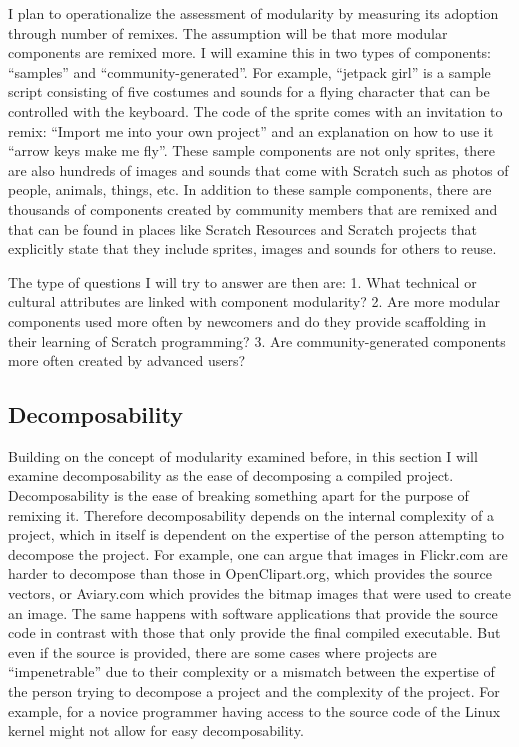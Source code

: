 I plan to operationalize the assessment of modularity by measuring its adoption through number of remixes.
The assumption will be that more modular components are remixed more.
I will examine this in two types of components:  ``samples'' and ``community-generated''.
For example, ``jetpack girl'' is a sample script consisting of five costumes and  sounds for a flying character that can be controlled with the keyboard.
The code of the sprite comes with an invitation to remix: ``Import me into your own project'' and an explanation on how to use it ``arrow keys make me fly''.
These sample components are not only sprites, there are also hundreds of images and sounds that come with Scratch such as photos of people, animals, things, etc.
In addition to these sample components, there are thousands of components created by community members that are remixed and that can be found in places like Scratch Resources and Scratch projects that explicitly state that they include sprites, images and sounds for others to reuse.

The type of questions I will try to answer are then are:
1. What technical or cultural attributes are linked with component modularity? 
2. Are more modular components used more often by newcomers and do they provide scaffolding in their learning of Scratch programming?
3. Are community-generated components more often created by advanced users?

\subsection{Decomposability}
Building on the concept of modularity examined before, in this section I will examine decomposability as the ease of decomposing a compiled project.
Decomposability is the ease of breaking something apart for the purpose of remixing it.
Therefore decomposability depends on the internal complexity of a project, which in itself is dependent on the expertise of the person attempting to decompose the project.
For example, one can argue that images in Flickr.com are harder to decompose than those in OpenClipart.org, which provides the source vectors, or Aviary.com which provides the bitmap images that were used to create an image.
The same happens with software applications that provide the source code in contrast with those that only provide the final compiled executable.
But even if the source is provided, there are some cases where projects are ``impenetrable'' due to their complexity or a mismatch between the expertise of the person trying to decompose a project and the complexity of the project. 
For example, for a novice programmer having access to the source code of the Linux kernel might not allow for easy decomposability.

